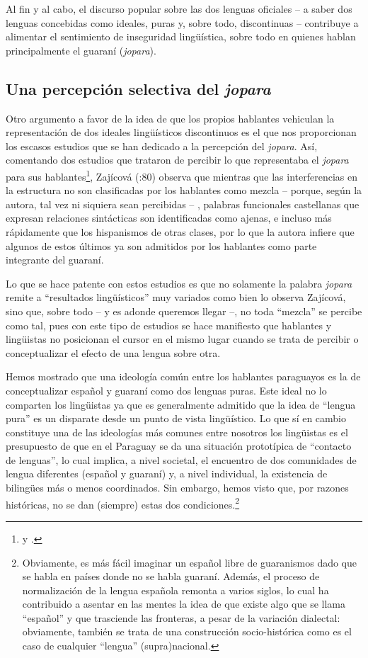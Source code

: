 \documentclass[output=paper]{langscibook}
\begin{document}
Al fin y al cabo, el discurso popular sobre las dos lenguas oficiales -- a saber dos lenguas concebidas como ideales, puras y, sobre todo, discontinuas -- contribuye a alimentar el sentimiento de inseguridad lingüística, sobre todo en quienes hablan principalmente el guaraní (\textit{jopara}). 

 \subsection{Una percepción selectiva del \textit{jopara}}


Otro argumento a favor de la idea de que los propios hablantes vehiculan la representación de dos ideales lingüísticos discontinuos es el que nos proporcionan los escasos estudios que se han dedicado a la percepción del \textit{jopara}. Así, comentando dos estudios que trataron de percibir lo que representaba el \textit{jopara} para sus hablantes\footnote{\citet{RepúblicadelParaguay2001} y \citet{Gynan2003}.}, Zajícová (\citeyear{Zajícová2014}:80) observa que mientras que las interferencias en la estructura no son clasificadas por los hablantes como mezcla \- -- porque, según la autora, tal vez ni siquiera sean percibidas -- \-, palabras funcionales castellanas que expresan relaciones sintácticas son identificadas como ajenas, e incluso más rápidamente que los hispanismos de otras clases, por lo que la autora infiere que algunos de estos últimos ya son admitidos por los hablantes como parte integrante del guaraní.

Lo que se hace patente con estos estudios es que no solamente la palabra \textit{jopara} remite a “resultados lingüísticos” muy variados como bien lo observa Zajícová, sino que, sobre todo -- y es adonde queremos llegar --, no toda “mezcla” se percibe como tal, pues con este tipo de estudios se hace manifiesto que hablantes y lingüistas no posicionan el cursor en el mismo lugar cuando se trata de percibir o conceptualizar el efecto de una lengua sobre otra. 

Hemos mostrado que una ideología común entre los hablantes paraguayos es la de conceptualizar español y guaraní como dos lenguas puras. Este ideal no lo comparten los lingüistas ya que es generalmente admitido que la idea de “lengua pura” es un disparate desde un punto de vista lingüístico. Lo que sí en cambio constituye una de las ideologías más comunes entre nosotros los lingüistas es el presupuesto de que en el Paraguay se da una situación prototípica de “contacto de lenguas”, lo cual implica, a nivel societal, el encuentro de dos comunidades de lengua diferentes (español y guaraní) y, a nivel individual, la existencia de bilingües más o menos coordinados. Sin embargo, hemos visto que, por razones históricas, no se dan (siempre) estas dos condiciones.\footnote{Obviamente, es más fácil imaginar un español libre de guaranismos dado que se habla en países donde no se habla guaraní. Además, el proceso de normalización de la lengua española remonta a varios siglos, lo cual ha contribuido a asentar en las mentes la idea de que existe algo que se llama “español” y que trasciende las fronteras, a pesar de la variación dialectal: obviamente, también se trata de una construcción socio-histórica como es el caso de cualquier “lengua” (supra)nacional.}
\end{document}
